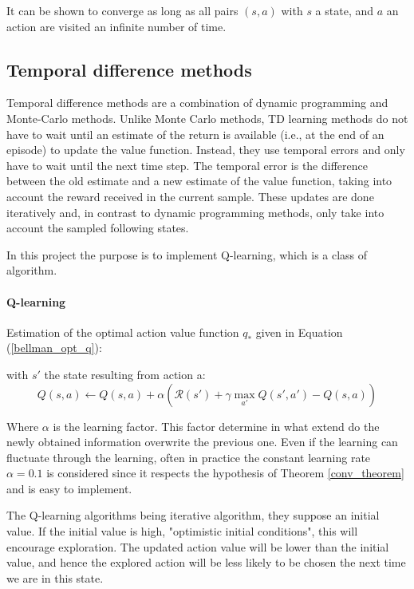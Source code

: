 \documentclass[14pt,a4paper]{article}
\theoremstyle{definition}
\begin{document}
 It can be shown to converge as long as all pairs $(s,a)$ with $s$ a state, and $a$ an action are visited an infinite number of time.
\subsection{Temporal difference methods} \label{TD}
Temporal difference methods are a combination of dynamic programming and Monte-Carlo methods. Unlike Monte Carlo methods, TD learning methods do not have to wait until an estimate of the return is available (i.e., at the end of an episode) to update the value function. Instead, they use temporal errors and only have to wait until the next time step. The temporal error is the difference between the old estimate and a new estimate of
the value function, taking into account the reward received in the current sample.
These updates are done iteratively and, in contrast to dynamic programming
methods, only take into account the sampled following states. \citep{Xia2015}

In this project the purpose is to implement Q-learning, which is a class of algorithm.


\paragraph{Q-learning} Estimation of the optimal action value function $q_*$ given in Equation (\ref{bellman_opt_q}):


with $s'$ the state resulting from action a:
\begin{equation}
Q(s,a) \leftarrow Q(s,a) + \alpha \left( \mathcal{R}(s') + \gamma \max_{a'}Q(s',a') - Q(s,a) \right) 
\label{eq:ql}
\end{equation}

Where $\alpha$ is the learning factor.  This factor determine in what extend do the newly obtained information overwrite the previous one. Even if the learning can fluctuate through the learning, often in practice the constant learning rate $\alpha = 0.1$ is considered since it respects the hypothesis of Theorem \ref{conv_theorem} and is easy to implement.

The Q-learning algorithms being iterative algorithm, they suppose an initial value. If the initial value is high, "optimistic initial conditions", this will encourage exploration. The updated action value will be lower than the initial value, and hence the explored action will be less likely to be chosen the next time we are in this state.
\end{document}
